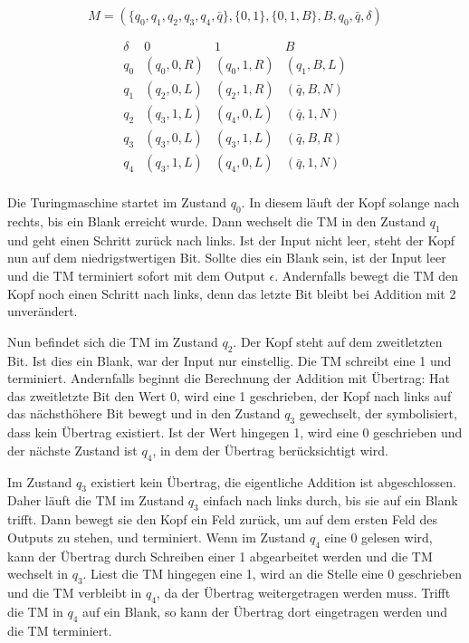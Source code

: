 \begin{exercise}{6}

\[M = (\{q_0, q_1, q_2, q_3, q_4, \bar{q}\}, \{0, 1\}, \{0, 1, B\}, B, q_0, \bar{q}, \delta)\]

\[\begin{array}{c|ccc}
\delta&0&1&B\\\hline
q_0&(q_0,0,R)&(q_0,1,R)&(q_1,B,L)\\
q_1&(q_2,0,L)&(q_2,1,R)&(\bar{q},B,N)\\
q_2&(q_3,1,L)&(q_4,0,L)&(\bar{q},1,N)\\
q_3&(q_3,0,L)&(q_3,1,L)&(\bar{q},B,R)\\
q_4&(q_3,1,L)&(q_4,0,L)&(\bar{q},1,N)\\
\end{array}\]

Die Turingmaschine startet im Zustand $q_0$. In diesem l\"auft der Kopf solange nach rechts, bis ein Blank erreicht wurde. Dann wechselt die TM in den Zustand $q_1$ und geht einen Schritt zur\"uck nach links. Ist der Input nicht leer, steht der Kopf nun auf dem niedrigstwertigen Bit. Sollte dies ein Blank sein, ist der Input leer und die TM terminiert sofort mit dem Output $\epsilon$. Andernfalls bewegt die TM den Kopf noch einen Schritt nach links, denn das letzte Bit bleibt bei Addition mit 2 unver\"andert. 

Nun befindet sich die TM im Zustand $q_2$. Der Kopf steht auf dem zweitletzten Bit. Ist dies ein Blank, war der Input nur einstellig. Die TM schreibt eine 1 und terminiert. Andernfalls beginnt die Berechnung der Addition mit \"Ubertrag: Hat das zweitletzte Bit den Wert 0, wird eine 1 geschrieben, der Kopf nach links auf das n\"achsth\"ohere Bit bewegt und in den Zustand $q_3$ gewechselt, der symbolisiert, dass kein \"Ubertrag existiert. Ist der Wert hingegen 1, wird eine 0 geschrieben und der n\"achste Zustand ist $q_4$, in dem der \"Ubertrag ber\"ucksichtigt wird.

Im Zustand $q_3$ existiert kein \"Ubertrag, die eigentliche Addition ist abgeschlossen. Daher l\"auft die TM im Zustand $q_3$ einfach nach links durch, bis sie auf ein Blank trifft. Dann bewegt sie den Kopf ein Feld zur\"uck, um auf dem ersten Feld des Outputs zu stehen, und terminiert. Wenn im Zustand $q_4$ eine 0 gelesen wird, kann der \"Ubertrag durch Schreiben einer 1 abgearbeitet werden und die TM wechselt in $q_3$. Liest die TM hingegen eine 1, wird an die Stelle eine 0 geschrieben und die TM verbleibt in $q_4$, da der \"Ubertrag weitergetragen werden muss. Trifft die TM in $q_4$ auf ein Blank, so kann der \"Ubertrag dort eingetragen werden und die TM terminiert. 

\end{exercise}